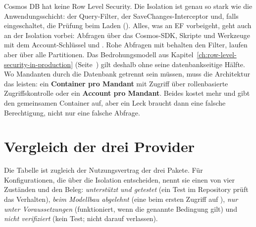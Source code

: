 \begin{important}
  Cosmos DB hat keine Row Level Security. Die Isolation ist genau so stark wie die
  Anwendungsschicht: der Query-Filter, der SaveChanges-Interceptor und, falls eingeschaltet, die
  Prüfung beim Laden (). Alles, was an EF
  vorbeigeht, geht auch an der Isolation vorbei: Abfragen über das Cosmos-SDK, Skripte und
  Werkzeuge mit dem Account-Schlüssel und .
  Rohe Abfragen mit  behalten den Filter, laufen aber über alle
  Partitionen. Das Bedrohungsmodell aus Kapitel~\ref{ch:row-level-security-in-production}
  (Seite~\pageref{sec:threat-model}) gilt deshalb ohne seine datenbankseitige Hälfte. Wo
  Mandanten durch die Datenbank getrennt sein müssen, muss die Architektur das leisten: ein
  \textbf{Container pro Mandant} mit Zugriff über rollenbasierte Zugriffskontrolle oder ein
  \textbf{Account pro Mandant}. Beides kostet mehr und gibt den gemeinsamen Container auf, aber
  ein Leck braucht dann eine falsche Berechtigung, nicht nur eine falsche Abfrage.
\end{important}

\section{Vergleich der drei Provider}\label{sec:provider-comparison}

Die Tabelle ist zugleich der Nutzungsvertrag der drei Pakete. Für Konfigurationen, die über die
Isolation entscheiden, nennt sie einen von vier Zuständen und den Beleg: \emph{unterstützt und
getestet} (ein Test im Repository prüft das Verhalten), \emph{beim Modellbau abgelehnt}
(eine  beim ersten Zugriff auf
), \emph{nur unter Voraussetzungen} (funktioniert, wenn die genannte Bedingung
gilt) und \emph{nicht verifiziert} (kein Test; nicht darauf verlassen).

